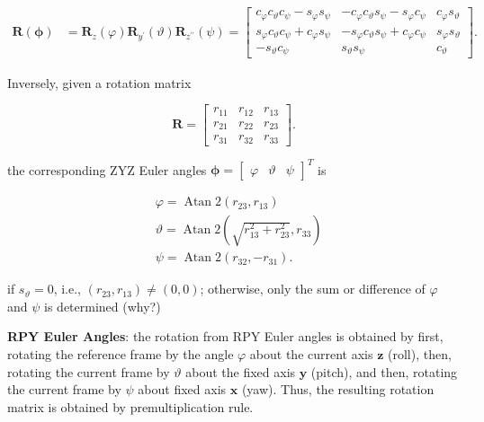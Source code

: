 \documentclass[10pt]{article}
\begin{document}
$$
    \begin{aligned}
\boldsymbol{R}(\boldsymbol{\phi}) & =\boldsymbol{R}_{z}(\varphi) \boldsymbol{R}_{y^{\prime}}(\vartheta) \boldsymbol{R}_{z^{\prime \prime}}(\psi) =\left[\begin{array}{ccc}
c_{\varphi} c_{\vartheta} c_{\psi}-s_{\varphi} s_{\psi} & -c_{\varphi} c_{\vartheta} s_{\psi}-s_{\varphi} c_{\psi} & c_{\varphi} s_{\vartheta} \\
s_{\varphi} c_{\vartheta} c_{\psi}+c_{\varphi} s_{\psi} & -s_{\varphi} c_{\vartheta} s_{\psi}+c_{\varphi} c_{\psi} & s_{\varphi} s_{\vartheta} \\
-s_{\vartheta} c_{\psi} & s_{\vartheta} s_{\psi} & c_{\vartheta}
\end{array}\right] .
\end{aligned}
$$


Inversely, given a rotation matrix

$$
\boldsymbol{R}=\left[\begin{array}{lll}
r_{11} & r_{12} & r_{13} \\
r_{21} & r_{22} & r_{23} \\
r_{31} & r_{32} & r_{33}
\end{array}\right] .
$$

the corresponding ZYZ Euler angles $\boldsymbol{\phi}=\left[\begin{array}{lll}\varphi & \vartheta & \psi\end{array}\right]^{T}$ is 


$$
\begin{aligned}
& \varphi=\operatorname{Atan} 2\left(r_{23}, r_{13}\right) \\
& \vartheta=\operatorname{Atan} 2\left(\sqrt{r_{13}^{2}+r_{23}^{2}}, r_{33}\right) \\
& \psi=\operatorname{Atan} 2\left(r_{32},-r_{31}\right) .
\end{aligned}
$$

 if $s_{\vartheta}=0$, i.e., $(r_{23}, r_{13})\not=(0,0)$; otherwise,  only the sum or difference of $\varphi$ and $\psi$ is determined (why?)


\bigskip
\noindent
\textbf{RPY  Euler Angles}: the rotation from RPY  Euler angles is obtained by first, rotating the reference frame by the angle $\varphi$ about the current axis $\boldsymbol{z}$ (roll), then,  rotating the current frame by $\vartheta$ about the fixed axis $\boldsymbol{y}$ (pitch), and then,  rotating the current frame by $\psi$ about fixed axis $\boldsymbol{x}$ (yaw). Thus, the resulting rotation matrix is obtained by  premultiplication rule.
\end{document}
